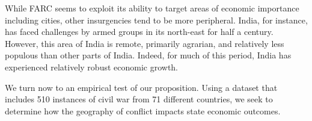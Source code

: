 While FARC seems to exploit its ability to target areas of economic importance including cities, other insurgencies tend to be more peripheral.  India, for instance, has faced challenges by armed groups in its north-east for half a century.  However, this area of India is remote, primarily agrarian, and relatively less populous than other parts of India.  Indeed, for much of this period, India has experienced relatively robust economic growth.

We turn now to an empirical test of our proposition.  Using a dataset that includes 510 instances of civil war from 71 different countries, we seek to determine how the geography of conflict impacts state economic outcomes.


%
